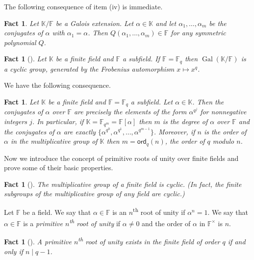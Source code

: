 \documentclass{toc}
\newtheorem{fact.}[theorem]{Fact}
\newcommand\F{{\mathbb{F}}}
\newcommand\K{{\mathbb{K}}}
\newcommand\ord{\textsf{ord}}
\DeclareMathOperator{\Gal}{Gal}  %
\newcommand{\ts}{\textsuperscript}
\begin{document}
The following consequence of item (iv) is immediate.
\begin{fact.}\label{symmetric_poly}
Let $\K/\F$ be a Galois extension.
Let $\alpha \in \K$ and let $\alpha_1, \dots , \alpha_m$
be the conjugates of $\alpha$ with $\alpha_1 = \alpha$.  Then
$Q(\alpha_1, \dots , \alpha_m) \in \F$ for any symmetric polynomial $Q$.
\end{fact.}

%
%
%
%

\begin{fact.}[{\cite[Ch. V, Thm. 5.4]{lang}}]
\label{frobenius}
Let $\K$ be a finite field and $\F$ a subfield.  
If $\F = \F_q$ then $\Gal(\K/\F)$  
is a cyclic group, generated by the Frobenius automorphism
$x \mapsto x^q$. 
\end{fact.}

We have the following consequence.
\begin{fact.} \label{order1}
Let $\K$ be a finite field and $\F = \F_q$ a subfield.  Let $\alpha \in \K$.
Then the conjugates of $\alpha$ over $\F$ are precisely the  
elements of the form $\alpha^{q^j}$ for nonnegative integers $j$.
In particular, if $\K = \F_{q^m} = \F[\alpha]$ then $m$ is the degree
of $\alpha$ over $\F$ and the conjugates of $\alpha$ are exactly
$\{\alpha^{q^0}, \alpha^{q^1},  \dots,  \alpha^{q^{m-1}} \}$.  
Moreover, if $n$ is the order of $\alpha$ in the multiplicative group
of $\K$ then $m = \ord_q(n)$, the order of $q$ modulo $n$.
\end{fact.}

Now we introduce the concept of primitive 
roots of unity over finite fields and prove some
of their basic properties. 
\begin{fact.}[{\cite[Ch. V, Thm. 5.3]{lang}}]
The multiplicative group of a finite field is cyclic.
(In fact, the finite subgroups of the multiplicative group
of any field are cyclic.)
\end{fact.}

\begin{definition}
Let $\F$ be a field.  We say that $\alpha\in\F$ is an
$n$\ts{th} root of unity if $\alpha^n=1$.  We say that
$\alpha\in\F$ is a \emph{primitive $n$\ts{th} root of unity}
if $\alpha\neq 0$ and the order of $\alpha$ in
 $\F^{\times}$ is $n$.
\end{definition}

\begin{fact.}[{\cite[Thm. 2.47(ii)]{lidl}}]
A primitive $n$\ts{th} root of unity exists in the finite
field of order $q$ if and only if $n\mid q-1$.
\end{fact.}
\end{document}
